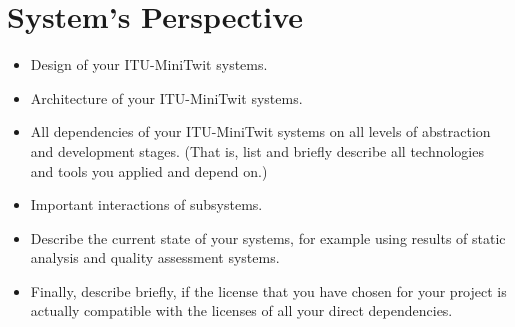 \section{System's Perspective}

\begin{itemize}
  \item Design of your ITU-MiniTwit systems.
  \item Architecture of your ITU-MiniTwit systems.
  \item All dependencies of your ITU-MiniTwit systems on all levels of abstraction and development stages. (That is, list and briefly describe all technologies and tools you applied and depend on.)
  \item Important interactions of subsystems.
  \item Describe the current state of your systems, for example using results of static analysis and quality assessment systems.
  \item Finally, describe briefly, if the license that you have chosen for your project is actually compatible with the licenses of all your direct dependencies.
  
\end{itemize}